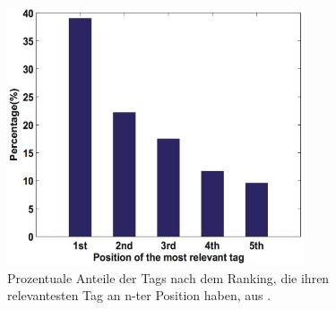 \begin{figure}[htbp]
  \centering
    \includegraphics[height=3in]{images/positionRelevantTags.png}
  \caption{Prozentuale Anteile der Tags nach dem Ranking, die ihren relevantesten Tag an n-ter Position haben, aus \cite{ranking}.}
  \label{fig:images_positionRelevantTags}
\end{figure}





